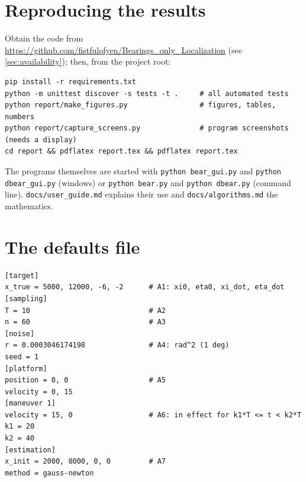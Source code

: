 \documentclass[11pt,a4paper]{article}
\theoremstyle{plain}
\theoremstyle{remark}
\begin{document}
\appendix
\section{Reproducing the results}
\label{app:repro}

Obtain the code from \url{https://github.com/fistfulofyen/Bearings_only_Localization}
(see \cref{sec:availability}); then, from the project root:
\begin{lstlisting}
pip install -r requirements.txt
python -m unittest discover -s tests -t .     # all automated tests
python report/make_figures.py                 # figures, tables, numbers
python report/capture_screens.py              # program screenshots (needs a display)
cd report && pdflatex report.tex && pdflatex report.tex
\end{lstlisting}
The programs themselves are started with \texttt{python bear\_gui.py} and
\texttt{python dbear\_gui.py} (windows) or \texttt{python bear.py} and
\texttt{python dbear.py} (command line). \texttt{docs/user\_guide.md}
explains their use and \texttt{docs/algorithms.md} the mathematics.

\section{The defaults file}
\label{app:def}

\begin{lstlisting}
[target]
x_true = 5000, 12000, -6, -2      # A1: xi0, eta0, xi_dot, eta_dot
[sampling]
T = 10                            # A2
n = 60                            # A3
[noise]
r = 0.0003046174198               # A4: rad^2 (1 deg)
seed = 1
[platform]
position = 0, 0                   # A5
velocity = 0, 15
[maneuver 1]
velocity = 15, 0                  # A6: in effect for k1*T <= t < k2*T
k1 = 20
k2 = 40
[estimation]
x_init = 2000, 8000, 0, 0         # A7
method = gauss-newton
\end{lstlisting}
\end{document}
